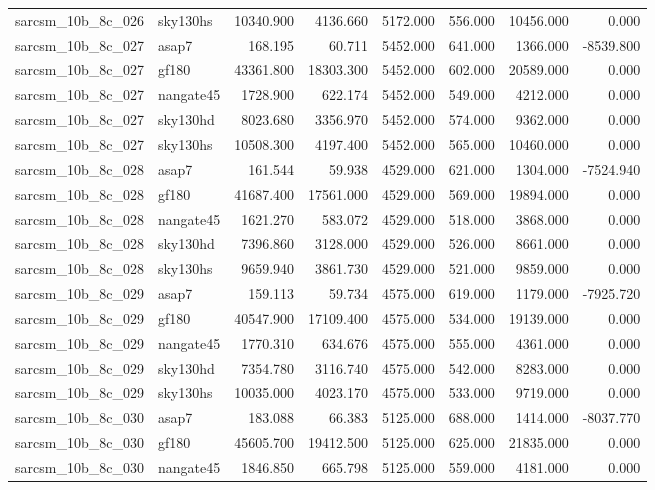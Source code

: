 \begin{tabular}{llrrrrrr}
sarcsm\_10b\_8c\_026 & sky130hs & 10340.900 & 4136.660 & 5172.000 & 556.000 & 10456.000 & 0.000 \\
sarcsm\_10b\_8c\_027 & asap7 & 168.195 & 60.711 & 5452.000 & 641.000 & 1366.000 & -8539.800 \\
sarcsm\_10b\_8c\_027 & gf180 & 43361.800 & 18303.300 & 5452.000 & 602.000 & 20589.000 & 0.000 \\
sarcsm\_10b\_8c\_027 & nangate45 & 1728.900 & 622.174 & 5452.000 & 549.000 & 4212.000 & 0.000 \\
sarcsm\_10b\_8c\_027 & sky130hd & 8023.680 & 3356.970 & 5452.000 & 574.000 & 9362.000 & 0.000 \\
sarcsm\_10b\_8c\_027 & sky130hs & 10508.300 & 4197.400 & 5452.000 & 565.000 & 10460.000 & 0.000 \\
sarcsm\_10b\_8c\_028 & asap7 & 161.544 & 59.938 & 4529.000 & 621.000 & 1304.000 & -7524.940 \\
sarcsm\_10b\_8c\_028 & gf180 & 41687.400 & 17561.000 & 4529.000 & 569.000 & 19894.000 & 0.000 \\
sarcsm\_10b\_8c\_028 & nangate45 & 1621.270 & 583.072 & 4529.000 & 518.000 & 3868.000 & 0.000 \\
sarcsm\_10b\_8c\_028 & sky130hd & 7396.860 & 3128.000 & 4529.000 & 526.000 & 8661.000 & 0.000 \\
sarcsm\_10b\_8c\_028 & sky130hs & 9659.940 & 3861.730 & 4529.000 & 521.000 & 9859.000 & 0.000 \\
sarcsm\_10b\_8c\_029 & asap7 & 159.113 & 59.734 & 4575.000 & 619.000 & 1179.000 & -7925.720 \\
sarcsm\_10b\_8c\_029 & gf180 & 40547.900 & 17109.400 & 4575.000 & 534.000 & 19139.000 & 0.000 \\
sarcsm\_10b\_8c\_029 & nangate45 & 1770.310 & 634.676 & 4575.000 & 555.000 & 4361.000 & 0.000 \\
sarcsm\_10b\_8c\_029 & sky130hd & 7354.780 & 3116.740 & 4575.000 & 542.000 & 8283.000 & 0.000 \\
sarcsm\_10b\_8c\_029 & sky130hs & 10035.000 & 4023.170 & 4575.000 & 533.000 & 9719.000 & 0.000 \\
sarcsm\_10b\_8c\_030 & asap7 & 183.088 & 66.383 & 5125.000 & 688.000 & 1414.000 & -8037.770 \\
sarcsm\_10b\_8c\_030 & gf180 & 45605.700 & 19412.500 & 5125.000 & 625.000 & 21835.000 & 0.000 \\
sarcsm\_10b\_8c\_030 & nangate45 & 1846.850 & 665.798 & 5125.000 & 559.000 & 4181.000 & 0.000 \\

\end{tabular}
